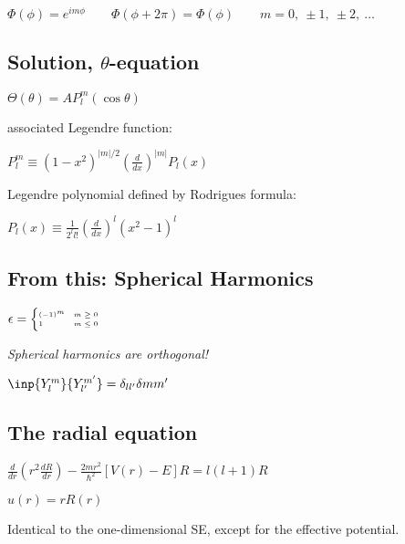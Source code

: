\documentclass[10pt,a4paper]{scrartcl}
\begin{document}
\begin{multicols*}{3}
	$\Phi(\phi)=e^{im\phi}\qquad\Phi(\phi+2\pi)=\Phi(\phi)\qquad m=0,\ \pm1,\ \pm2,\ \dots$
	
	\subsection{Solution, $\theta$-equation}
	
	$\Theta(\theta)=AP_l^m(\cos\theta)$
	
	associated Legendre function: 
	
	$P_l^m\equiv(1-x^2)^{|m|/2}\left(\frac{d}{dx}\right)^{|m|}P_l(x)$
	
	Legendre polynomial defined by Rodrigues formula:
	
	$P_l(x)\equiv\frac{1}{2^ll!}\left(\frac{d}{dx}\right)^l(x^2-1)^l$
	
	\subsection{From this: Spherical Harmonics}
	
	\begin{center}
	
	\vspace{1ex}
	
	$\epsilon = \tiny \begin{cases}
	(-1)^m&m\geq0\\
	1&m\leq0	
	\end{cases}$
	\normalsize
	\end{center}
	
	\emph{Spherical harmonics are orthogonal!}
	
	$\inp{Y_l^m}{Y_{l'}^{m'}}=\delta_{ll'}\delta{mm'}$
	
	\subsection{The radial equation}
	
	$\frac{d}{dr}\left(r^2\frac{dR}{dr}\right)-\frac{2mr^2}{\hbar^2}[V(r)-E]R=l(l+1)R$
	
	$u(r)=rR(r)$
	
	\begin{center}
	\end{center}
	
	Identical to the one-dimensional SE, except for the effective potential.
	

\end{multicols*}
\end{document}
